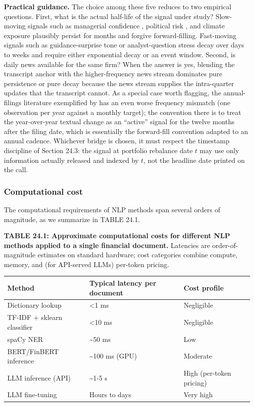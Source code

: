 \textbf{Practical guidance.} The choice among these five reduces to two empirical questions. First, what is the actual half-life of the signal under study? Slow-moving signals such as managerial confidence \citep{kim2024transcripts}, political risk \citep{hassan2019politicalrisk}, and climate exposure \citep{sautner2023firm} plausibly persist for months and forgive forward-filling. Fast-moving signals such as guidance-surprise tone or analyst-question stress decay over days to weeks and require either exponential decay or an event window. Second, is daily news available for the same firm? When the answer is yes, blending the transcript anchor with the higher-frequency news stream dominates pure persistence or pure decay because the news stream supplies the intra-quarter updates that the transcript cannot. As a special case worth flagging, the annual-filings literature exemplified by \cite{cohen2020lazy} has an even worse frequency mismatch (one observation per year against a monthly target); the convention there is to treat the year-over-year textual change as an ``active'' signal for the twelve months after the filing date, which is essentially the forward-fill convention adapted to an annual cadence. Whichever bridge is chosen, it must respect the timestamp discipline of Section 24.3: the signal at portfolio rebalance date $t$ may use only information actually released and indexed by $t$, not the headline date printed on the call.

\subsubsection{Computational cost}

The computational requirements of NLP methods span several orders of magnitude, as we summarize in TABLE 24.1.

\textbf{TABLE 24.1: Approximate computational costs for different NLP methods applied to a single financial document.} Latencies are order-of-magnitude estimates on standard hardware; cost categories combine compute, memory, and (for API-served LLMs) per-token pricing.

\bigskip\noindent
\begin{tabular}{p{}p{}p{}}
\toprule
Method & Typical latency per document & Cost profile \\
\hline
Dictionary lookup & \textless  1 ms & Negligible \\
TF-IDF + sklearn classifier & \textless  10 ms & Negligible \\
spaCy NER & {\textasciitilde}50 ms & Low \\
BERT/FinBERT inference & {\textasciitilde}100 ms (GPU) & Moderate \\
LLM inference (API) & {\textasciitilde}1-5 s & High (per-token pricing) \\
LLM fine-tuning & Hours to days & Very high \\
\bottomrule
\end{tabular}

